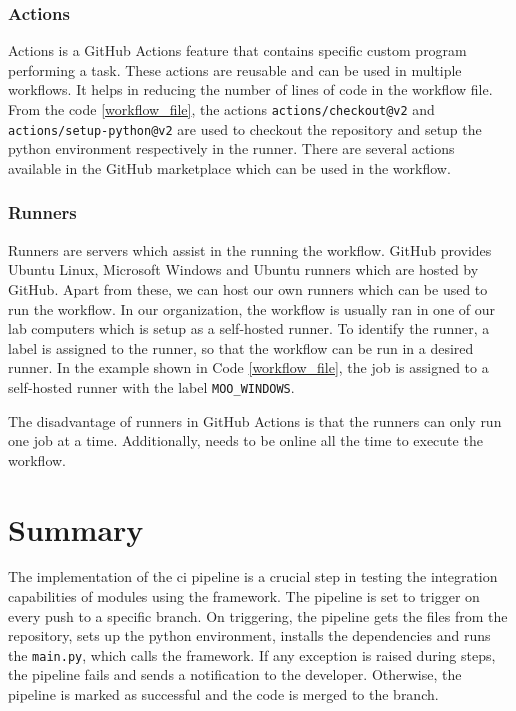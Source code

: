 \subsubsection{Actions}
Actions is a GitHub Actions feature that contains specific custom program performing a task. These actions are reusable and can be used in multiple workflows.
It helps in reducing the number of lines of code in the workflow file. From the code \ref{workflow_file}, the actions \texttt{actions/checkout@v2} and 
\texttt{actions/setup-python@v2} are used to checkout the repository and setup the python environment respectively in the runner. There are several actions 
available in the GitHub marketplace which can be used in the workflow.

\subsubsection{Runners}
Runners are servers which assist in the running the workflow. GitHub provides Ubuntu Linux, Microsoft Windows and Ubuntu runners which are hosted by GitHub.
Apart from these, we can host our own runners which can be used to run the workflow. In our organization, the workflow is usually ran in one of our lab computers
which is setup as a self-hosted runner. To identify the runner, a label is assigned to the runner, so that the workflow can be run in a desired runner. 
In the example shown in Code \ref{workflow_file}, the job is assigned to a self-hosted runner with the label \texttt{MOO\_WINDOWS}. 

The disadvantage of runners in GitHub Actions is that the runners can only run one job at a time. Additionally, needs to be online all the time to execute the 
workflow. 

\section{Summary}
The implementation of the \acrshort{ci} pipeline is a crucial step in testing the integration capabilities of modules using the framework. The pipeline is set to trigger on every push to
a specific branch. On triggering, the pipeline gets the files from the repository, sets up the python environment, installs the dependencies and runs the 
\texttt{main.py}, which calls the framework. If any exception is raised during steps, the pipeline fails and sends a notification to the developer. Otherwise,
the pipeline is marked as successful and the code is merged to the branch.
